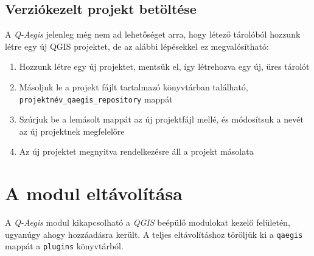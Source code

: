\subsection{Verziókezelt projekt betöltése}
A \emph{Q-Aegis} jelenleg még nem ad lehetőséget arra, hogy létező tárolóból hozzunk létre egy új QGIS projektet, de az alábbi lépésekkel ez megvalósítható:
\begin{enumerate}
	\item Hozzunk létre egy új projektet, mentsük el, így létrehozva egy új, üres tárolót
	\item Másoljuk le a projekt fájlt tartalmazó könyvtárban található, \texttt{projektnév\_qaegis\_repository} mappát
	\item Szúrjuk be a lemásolt mappát az új projektfájl mellé, és módosítsuk a nevét az új projektnek megfelelőre
	\item Az új projektet megnyitva rendelkezésre áll a projekt másolata
\end{enumerate}
	
\section{A modul eltávolítása}
A \emph{Q-Aegis} modul kikapcsolható a \emph{QGIS} beépülő modulokat kezelő felületén, ugyanúgy ahogy hozzáadásra került. A teljes eltávolításhoz töröljük ki a \texttt{qaegis} mappát a \texttt{plugins} könyvtárból.
	
